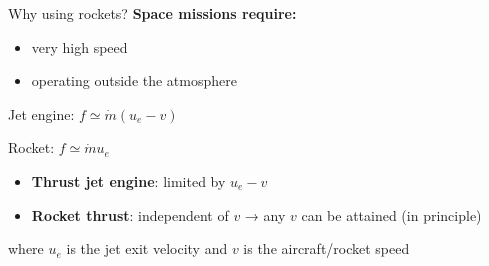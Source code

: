 \documentclass[
  ignorenonframetext,
]{beamer}
\providecommand{\tightlist}{%
  \setlength{\itemsep}{0pt}\setlength{\parskip}{0pt}}\usepackage{longtable,booktabs,array}
\begin{document}
\begin{frame}{Why using rockets?}
\protect\hypertarget{why-using-rockets}{}
\textbf{Space missions require:}

\begin{itemize}
\tightlist
\item
  very high speed
\item
  operating outside the atmosphere
\end{itemize}

\begin{block}{Jet engine: \(f \simeq \dot{m} (u_e - v)\)}
\protect\hypertarget{jet-engine-f-simeq-dotm-u_e---v}{}
\end{block}

\begin{block}{Rocket: \(f \simeq \dot{m} u_e\)}
\protect\hypertarget{rocket-f-simeq-dotm-u_e}{}
\begin{itemize}
\tightlist
\item
  \textbf{Thrust jet engine}: limited by \(u_e - v\)
\item
  \textbf{Rocket thrust}: independent of \(v\) → any \(v\) can be
  attained (in principle)
\end{itemize}

where \(u_e\) is the jet exit velocity and \(v\) is the aircraft/rocket
speed
\end{block}
\end{frame}
\end{document}
